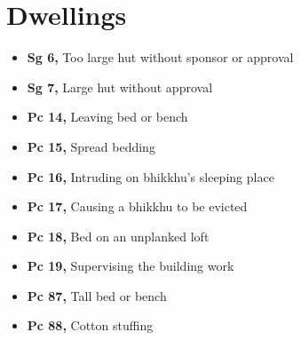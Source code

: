 \chapter{Dwellings}

\begin{itemize}
\tightlist
\item
  \textbf{Sg 6,} Too large hut without sponsor or approval
\item
  \textbf{Sg 7,} Large hut without approval
\item
  \textbf{Pc 14,} Leaving bed or bench
\item
  \textbf{Pc 15,} Spread bedding
\item
  \textbf{Pc 16,} Intruding on bhikkhu's sleeping place
\item
  \textbf{Pc 17,} Causing a bhikkhu to be evicted
\item
  \textbf{Pc 18,} Bed on an unplanked loft
\item
  \textbf{Pc 19,} Supervising the building work
\item
  \textbf{Pc 87,} Tall bed or bench
\item
  \textbf{Pc 88,} Cotton stuffing
\end{itemize}

